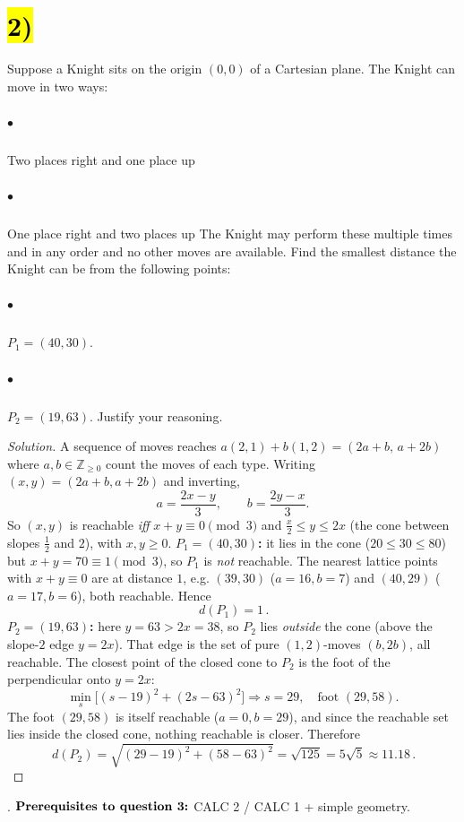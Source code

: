 \documentclass[11pt]{article}
\newenvironment{solution}
  {\renewcommand\qedsymbol{$\blacksquare$}\begin{proof}[Solution]}
  {\end{proof}}
\begin{document}
\section*{\hl{2)}} Suppose a Knight sits on the origin $(0,0)$ of a Cartesian plane. The Knight can move in two ways:
\subparagraph*{$\bullet$} Two places right and one place up\vspace*{-\baselineskip}
\subparagraph*{$\bullet$} One place right and two places up\newline\newline
The Knight may perform these multiple times and in any order and no other moves are available. Find the smallest distance the Knight can be from the following points:
\subparagraph*{$\bullet$} $P_1 = (40,30)$.\vspace*{-\baselineskip}
\subparagraph*{$\bullet$} $P_2 = (19,63)$.\newline\newline
Justify your reasoning.
\begin{solution}
A sequence of moves reaches $a(2,1)+b(1,2)=(2a+b,\,a+2b)$ where $a,b\in\mathds{Z}_{\ge0}$ count the moves of each type. Writing $(x,y)=(2a+b,a+2b)$ and inverting,
$$a=\frac{2x-y}{3},\qquad b=\frac{2y-x}{3}.$$
So $(x,y)$ is reachable \emph{iff} $x+y\equiv0\pmod3$ and $\tfrac{x}{2}\le y\le 2x$ (the cone between slopes $\tfrac12$ and $2$), with $x,y\ge0$.
\newline\newline
\textbf{$P_1=(40,30)$:} it lies in the cone ($20\le30\le80$) but $x+y=70\equiv1\pmod3$, so $P_1$ is \emph{not} reachable. The nearest lattice points with $x+y\equiv0$ are at distance $1$, e.g. $(39,30)$ ($a=16,b=7$) and $(40,29)$ ($a=17,b=6$), both reachable. Hence
$$\boxed{\,d(P_1)=1\,}.$$
\textbf{$P_2=(19,63)$:} here $y=63>2x=38$, so $P_2$ lies \emph{outside} the cone (above the slope-$2$ edge $y=2x$). That edge is the set of pure $(1,2)$-moves $(b,2b)$, all reachable. The closest point of the closed cone to $P_2$ is the foot of the perpendicular onto $y=2x$:
$$\min_s\big[(s-19)^2+(2s-63)^2\big]\Rightarrow s=29,\quad\text{foot }(29,58).$$
The foot $(29,58)$ is itself reachable ($a=0,b=29$), and since the reachable set lies inside the closed cone, nothing reachable is closer. Therefore
$$\boxed{\,d(P_2)=\sqrt{(29-19)^2+(58-63)^2}=\sqrt{125}=5\sqrt5\approx11.18\,}.$$
\end{solution}


{\color{white}.}\newline
$\text{\bf {Prerequisites to question 3:}}$ CALC 2 / CALC 1 + simple geometry.
\end{document}

